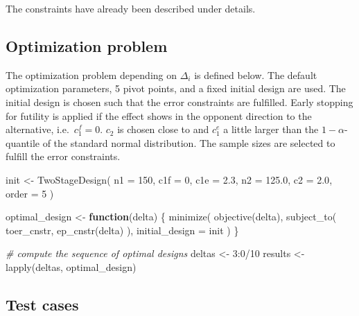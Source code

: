 \documentclass[
]{book}
\newenvironment{Shaded}{\begin{snugshade}}{\end{snugshade}}
\newcommand{\AttributeTok}[1]{\textcolor[rgb]{0.77,0.63,0.00}{#1}}
\newcommand{\CommentTok}[1]{\textcolor[rgb]{0.56,0.35,0.01}{\textit{#1}}}
\newcommand{\ControlFlowTok}[1]{\textcolor[rgb]{0.13,0.29,0.53}{\textbf{#1}}}
\newcommand{\DecValTok}[1]{\textcolor[rgb]{0.00,0.00,0.81}{#1}}
\newcommand{\FloatTok}[1]{\textcolor[rgb]{0.00,0.00,0.81}{#1}}
\newcommand{\FunctionTok}[1]{\textcolor[rgb]{0.00,0.00,0.00}{#1}}
\newcommand{\NormalTok}[1]{#1}
\newcommand{\OtherTok}[1]{\textcolor[rgb]{0.56,0.35,0.01}{#1}}
\newcommand{\SpecialCharTok}[1]{\textcolor[rgb]{0.00,0.00,0.00}{#1}}
\begin{document}
The constraints have already been described under details.

\hypertarget{optimization-problem}{%
\subsection{Optimization problem}\label{optimization-problem}}

The optimization problem depending on \(\Delta_i\) is defined below.
The default optimization parameters, 5 pivot points, and a fixed initial design
are used.
The initial design is chosen such that the error constraints are
fulfilled. Early stopping for futility is applied if the effect shows
in the opponent direction to the alternative, i.e.~\(c_1^f=0\).
\(c_2\) is chosen close to and \(c_1^e\) a little larger than the \(1-\alpha\)-quantile
of the standard normal distribution. The sample sizes are selected
to fulfill the error constraints.

\begin{Shaded}
\begin{Highlighting}[]
\NormalTok{init }\OtherTok{\textless{}{-}} \FunctionTok{TwoStageDesign}\NormalTok{(}
    \AttributeTok{n1    =} \DecValTok{150}\NormalTok{,}
    \AttributeTok{c1f   =} \DecValTok{0}\NormalTok{,}
    \AttributeTok{c1e   =} \FloatTok{2.3}\NormalTok{,}
    \AttributeTok{n2    =} \FloatTok{125.0}\NormalTok{,}
    \AttributeTok{c2    =} \FloatTok{2.0}\NormalTok{,}
    \AttributeTok{order =} \DecValTok{5}
\NormalTok{)}

\NormalTok{optimal\_design }\OtherTok{\textless{}{-}} \ControlFlowTok{function}\NormalTok{(delta) \{}
    \FunctionTok{minimize}\NormalTok{(}
        \FunctionTok{objective}\NormalTok{(delta),}
        \FunctionTok{subject\_to}\NormalTok{(}
\NormalTok{            toer\_cnstr,}
            \FunctionTok{ep\_cnstr}\NormalTok{(delta)}
\NormalTok{        ),}
        \AttributeTok{initial\_design =}\NormalTok{ init}
\NormalTok{    )}
\NormalTok{\}}

\CommentTok{\# compute the sequence of optimal designs}
\NormalTok{deltas  }\OtherTok{\textless{}{-}} \DecValTok{3}\SpecialCharTok{:}\DecValTok{0}\SpecialCharTok{/}\DecValTok{10}
\NormalTok{results }\OtherTok{\textless{}{-}} \FunctionTok{lapply}\NormalTok{(deltas, optimal\_design)}
\end{Highlighting}
\end{Shaded}

\hypertarget{test-cases-6}{%
\subsection{Test cases}\label{test-cases-6}}
\end{document}
